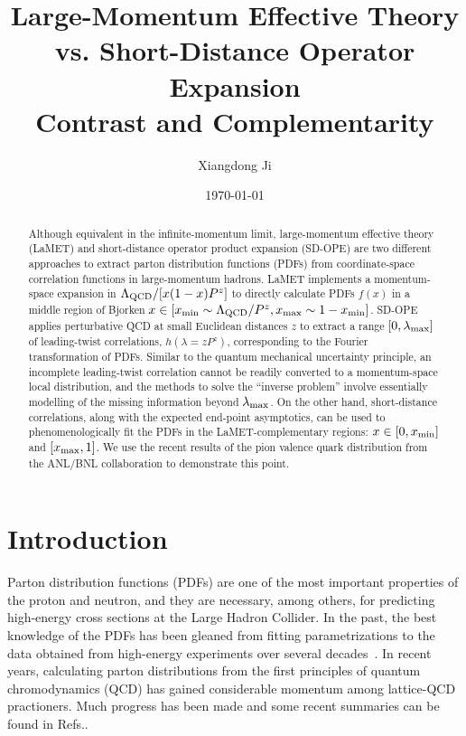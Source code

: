 \documentclass[prd,aps,twocolumn,preprintnumbers,showpacs,nofootinbib,superscriptaddress,notitlepage]{revtex4-2}
\begin{document}
\title{Large-Momentum Effective Theory vs. Short-Distance Operator Expansion \\ Contrast and Complementarity}

\author{Xiangdong Ji}


\date{\today{}}
\begin{abstract}

Although equivalent in the infinite-momentum limit, large-momentum effective theory (LaMET) and short-distance operator product expansion (SD-OPE) are two different approaches to extract parton distribution functions (PDFs) from coordinate-space correlation functions in large-momentum hadrons. LaMET implements a momentum-space expansion in $\Lambda_{\rm QCD}/[x(1-x)P^z]$ to directly calculate PDFs $f(x)$ in a middle region of Bjorken $x\in [x_{\rm min}\sim \Lambda_{\rm QCD}/P^z, x_{\rm max}\sim 1-x_{\min}]$. SD-OPE applies perturbative QCD at small Euclidean distances $z$ to extract a range $[0,\lambda_{\rm max}]$ of leading-twist correlations, $h(\lambda=zP^z)$, corresponding to the Fourier transformation of PDFs. Similar to the quantum mechanical uncertainty principle, an incomplete leading-twist correlation cannot be readily converted to a momentum-space local distribution, and the methods to solve the ``inverse problem'' involve essentially modelling of the missing information beyond $\lambda_{\rm max}$. On the other hand, short-distance correlations, along with the expected end-point asymptotics, can be used to phenomenologically fit the PDFs in the LaMET-complementary regions: $x\in [0,x_{\rm min}]$ and $[x_{\rm max}, 1]$. We use the recent results of the pion valence quark distribution from the ANL/BNL collaboration to demonstrate this point. 
\end{abstract} \maketitle

\section{Introduction}

Parton distribution functions (PDFs) are one of the most important properties of the proton
and neutron, and they are necessary, among others,
for predicting high-energy cross sections at the Large Hadron Collider. In the past, the best knowledge of the PDFs has been gleaned from fitting parametrizations to the data obtained from high-energy experiments over several decades~\cite{Gao:2017yyd}.
In recent years, calculating parton distributions from the first principles of quantum chromodynamics (QCD) has gained considerable momentum among 
lattice-QCD practioners. Much progress has been made and some recent summaries can be found in Refs.\cite{Lin:2017snn,Cichy:2018mum,Ji:2020ect,Constantinou:2020hdm}. 
\end{document}
